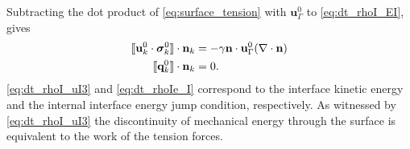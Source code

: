 Subtracting the dot product of \ref{eq:surface_tension} with $\textbf{u}_\Gamma^0$ to \ref{eq:dt_rhoI_EI}, gives 
\begin{align}
    \label{eq:dt_rhoI_uI3}
    \Jump{\textbf{u}_k^0 \cdot \bm{\sigma}_k^0}
    &=
    -\gamma\textbf{n}\cdot \textbf{u}_{\Gamma}^0(\div \textbf{n})\\
    \label{eq:dt_rhoIe_I}
    \Jump{ \textbf{q}_k^0}
    &= 
     0.
\end{align}
\ref{eq:dt_rhoI_uI3} and \ref{eq:dt_rhoIe_I} correspond to the interface kinetic energy and the internal interface energy jump condition, respectively. 
As witnessed by \ref{eq:dt_rhoI_uI3} the discontinuity of mechanical energy through the surface is equivalent to the work of the tension forces. 
